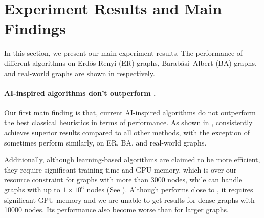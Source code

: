 \section{Experiment Results and Main Findings}\label{sec:exp-results}
In this section, we present our main experiment results. The performance of different algorithms on Erd\H{o}s-Reny\'i (ER) graphs, Barab\'asi–Albert (BA) graphs, and real-world graphs are shown in  respectively. 


\paragraph{AI-inspired algorithms don't outperform \redumis.} Our first main finding is that, current AI-inspired algorithms do not outperform the best classical heuristics \redumis in terms of performance. As shown in , \redumis consistently achieves superior results compared to all other methods, with the exception of \isco sometimes perform similarly, on ER, BA, and real-world graphs. 

Additionally, although learning-based algorithms are claimed to be more efficient, they require significant training time and GPU memory, which is over our resource constraint for graphs with more than 3000 nodes, while \redumis can handle graphs with up to $1\times 10^6$ nodes (See ). Although \isco performs close to \redumis, it requires significant GPU memory and we are unable to get results for dense graphs with 10000 nodes. Its performance also become worse than \redumis for larger graphs.

